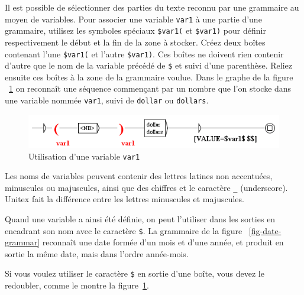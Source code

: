 Il est possible de sélectionner des parties du texte reconnu par une grammaire au moyen
de variables. Pour associer une variable \verb+var1+ à une partie d’une grammaire, utilisez
les symboles spéciaux \verb+$var1(+ et \verb+$var1)+ pour définir respectivement le début et
la fin de la zone à stocker. Créez deux boîtes contenant l’une \verb+$var1(+ et l’autre
\verb+$var1)+. Ces boîtes ne doivent rien contenir d’autre que le nom de la variable précédé de
 \verb+$+ et suivi d’une parenthèse. Reliez ensuite ces boîtes à la zone de la grammaire voulue.
 Dans le graphe de la figure ~\ref{fig-using-variable} on reconnaît une séquence commençant par
 un nombre que l’on stocke dans une variable nommée \verb+var1+, suivi de \verb+dollar+ ou
 \verb+dollars+.

\bigskip
\begin{figure}[h]
\begin{center}
\includegraphics[width=13.5cm]{resources/img/fig5-16.png}
\caption{Utilisation d’une variable
\texttt{var1}\label{fig-using-variable}}
\end{center}
\end{figure}

\noindent Les noms de variables peuvent contenir des lettres latines non accentuées, minuscules
ou majuscules, ainsi que des chiffres et le caractère \verb+_+ (underscore).
\index{\verb+_+} Unitex fait la différence entre les lettres minuscules
et majuscules.

\bigskip
\noindent Quand une variable a ainsi été définie, on peut l’utiliser dans les sorties en encadrant
son nom avec le caractère \verb+$+.\index{\verb+$+} La grammaire de la figure
~\ref{fig-date-grammar} reconnaît une date formée d’un mois et d’une année,
 et produit en sortie la même date, mais dans l’ordre année-mois.

\noindent Si vous voulez utiliser le caractère \verb+$+ en sortie d'une boîte, vous devez le
redoubler, comme le montre la figure~\ref{fig-using-variable}.

